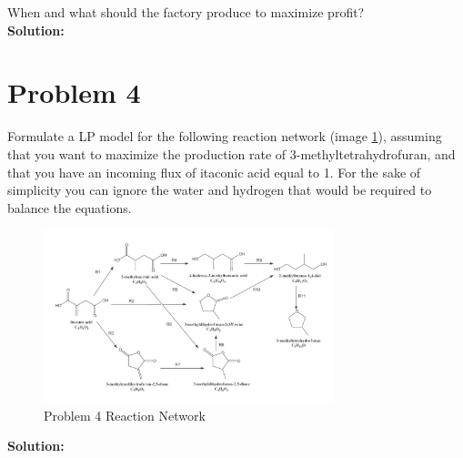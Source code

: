 \documentclass[11pt]{article}
\begin{document}
When and what should the factory produce to maximize profit?
\\
\textbf{Solution: }

\section{Problem 4}
Formulate a LP model for the following reaction network (image \ref{fig:problem_4_rn}), assuming that you want
to maximize the production rate of 3-methyltetrahydrofuran, and that you have an incoming
flux of itaconic acid equal to 1. For the sake of simplicity you can ignore the water and
hydrogen that would be required to balance the equations.
\begin{figure}[htbp]
  \centerline{\includegraphics[width=0.75\textwidth]{images/image.png}}
  \caption{Problem 4 Reaction Network}
  \label{fig:problem_4_rn}
\end{figure}

\textbf{Solution: }
\end{document}
